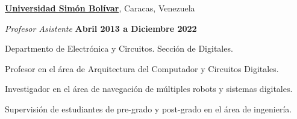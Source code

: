 \documentclass[10pt]{article}
\begin{document}
\href{http://www.usb.ve/}{\textbf{Universidad Simón Bolívar}}, Caracas, Venezuela
\begin{outerlist}
    \item[] \textit{Profesor Asistente}%
            \hfill \textbf{Abril 2013 a Diciembre 2022}
            \begin{innerlist}
                \item Departmento de Electrónica y Circuitos. Sección de Digitales.
                \item Profesor en el área de Arquitectura del Computador y Circuitos Digitales.
                \item Investigador en el área de navegación de múltiples robots
                  y sistemas digitales.
                \item Supervisión de estudiantes de pre-grado y post-grado en el área de ingeniería.
            \end{innerlist}

%
\end{outerlist}
\end{document}
